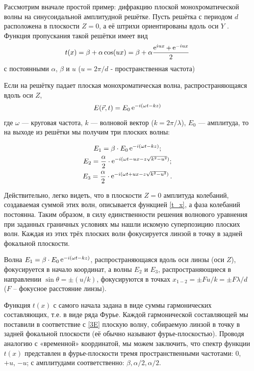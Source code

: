 \documentclass[a5paper,10pt, twoside]{article} %
\begin{document}
		Рассмотрим вначале простой пример: дифракцию плоской монохроматической волны на синусоидальной амплитудной решётке. Пусть решётка с периодом $d$ расположена в плоскости $Z = 0$, а её штрихи ориентированы вдоль оси $Y$ . Функция пропускания такой решётки имеет вид
		\begin{equation}\label{t_x}
			t(x) = \beta + \alpha \cos (ux) = \beta + \alpha \frac{\mathop{\mathrm e}\nolimits^{iux} + \mathop{\mathrm e}\nolimits^{-iux}}{2}
		\end{equation}
		с постоянными $\alpha$, $\beta$ и $u$ ($u = 2 \pi / d$ - пространственная частота) 
		
		Если на решётку падает плоская монохроматическая волна, распространяющаяся вдоль оси $Z$,
		\begin{equation}
			E(\vec{r}, t) = E_0 \mathop{\mathrm e}\nolimits^{-i(\omega t - kz)}
		\end{equation}
		где $\omega$ — круговая частота, $k$ — волновой вектор ($k = 2\pi / \lambda$), $E_0$ — амплитуда, то на выходе из решётки мы получим три плоских волны:
		
		\begin{equation}\label{3E}
		\begin{gathered} 
		    E_1 = \beta \cdot E_0 \mathop{\mathrm e}\nolimits^{-i(\omega t - kz)}; \\
		    E_2 = \frac{\alpha}{2} \cdot \mathop{\mathrm e}\nolimits^{-i(\omega t - ux - z \sqrt{k^2-u^2})}; \\
		    E_3 = \frac{\alpha}{2} \cdot \mathop{\mathrm e}\nolimits^{-i(\omega t + ux - z \sqrt{k^2-u^2})}.
		 \end{gathered}
		\end{equation}
		
		Действительно, легко видеть, что в плоскости $Z = 0$ амплитуда колебаний, создаваемая суммой этих волн, описывается функцией \eqref{t_x}, а фаза колебаний постоянна. Таким образом, в силу единственности решения волнового уравнения при заданных граничных условиях мы нашли искомую суперпозицию плоских волн. Каждая из этих трёх плоских волн фокусируется линзой в точку в задней фокальной плоскости.
		
		Волна $E_1 = \beta \cdot E_0 \mathop{\mathrm e}\nolimits^{-i(\omega t - kz)}$, распространяющаяся вдоль оси линзы (оси $Z$), фокусируется в начало координат, а волны $E_2$ и $E_3$, распространяющиеся в направлении $\sin{\theta} = \pm (u/k)$, фокусируются в точках $x_{1-2} = \pm F u / k = \pm F \lambda / d$ ($F$ -- фокусное расстояние линзы).
		
		
		Функция $t(x)$ с самого начала задана в виде суммы гармонических составляющих, т.е. в виде ряда Фурье. Каждой гармонической составляющей мы поставили в соответствие с \eqref{3E} плоскую волну, собираемую линзой в точку в задней фокальной плоскости (её обычно называют фурье-плоскостью). Проводя аналогию с «временной» координатой, мы можем заключить, что спектр функции $t(x)$ представлен в фурье-плоскости тремя пространственными частотами: 0, $+u$, $-u$; с амплитудами соответственно: $\beta, \alpha / 2, \alpha / 2$.
		
\end{document}
